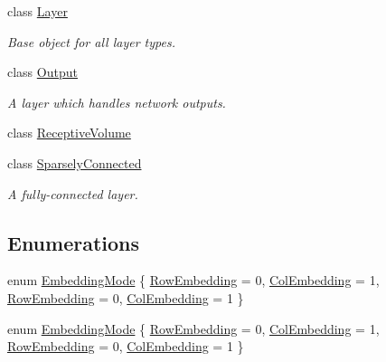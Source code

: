 \begin{DoxyCompactItemize}
class \hyperlink{classffnn_1_1layer_1_1_layer}{Layer}
\begin{DoxyCompactList}\small\item\em Base object for all layer types. \end{DoxyCompactList}\item 
class \hyperlink{classffnn_1_1layer_1_1_output}{Output}
\begin{DoxyCompactList}\small\item\em A layer which handles network outputs. \end{DoxyCompactList}\item 
class \hyperlink{classffnn_1_1layer_1_1_receptive_volume}{Receptive\-Volume}
\item 
class \hyperlink{classffnn_1_1layer_1_1_sparsely_connected}{Sparsely\-Connected}
\begin{DoxyCompactList}\small\item\em A fully-\/connected layer. \end{DoxyCompactList}\end{DoxyCompactItemize}
\subsection*{Enumerations}
\begin{DoxyCompactItemize}
\item 
enum \hyperlink{namespaceffnn_1_1layer_a254f16beba4fb335d935e9b43bb9e69a}{Embedding\-Mode} \{ \hyperlink{namespaceffnn_1_1layer_a254f16beba4fb335d935e9b43bb9e69aa56bf723aeae4562f2fe05ae5e675da92}{Row\-Embedding} = 0, 
\hyperlink{namespaceffnn_1_1layer_a254f16beba4fb335d935e9b43bb9e69aaede1065f5863208cae7e55561966a182}{Col\-Embedding} = 1, 
\hyperlink{namespaceffnn_1_1layer_a254f16beba4fb335d935e9b43bb9e69aa56bf723aeae4562f2fe05ae5e675da92}{Row\-Embedding} = 0, 
\hyperlink{namespaceffnn_1_1layer_a254f16beba4fb335d935e9b43bb9e69aaede1065f5863208cae7e55561966a182}{Col\-Embedding} = 1
 \}
\item 
enum \hyperlink{namespaceffnn_1_1layer_a254f16beba4fb335d935e9b43bb9e69a}{Embedding\-Mode} \{ \hyperlink{namespaceffnn_1_1layer_a254f16beba4fb335d935e9b43bb9e69aa56bf723aeae4562f2fe05ae5e675da92}{Row\-Embedding} = 0, 
\hyperlink{namespaceffnn_1_1layer_a254f16beba4fb335d935e9b43bb9e69aaede1065f5863208cae7e55561966a182}{Col\-Embedding} = 1, 
\hyperlink{namespaceffnn_1_1layer_a254f16beba4fb335d935e9b43bb9e69aa56bf723aeae4562f2fe05ae5e675da92}{Row\-Embedding} = 0, 
\hyperlink{namespaceffnn_1_1layer_a254f16beba4fb335d935e9b43bb9e69aaede1065f5863208cae7e55561966a182}{Col\-Embedding} = 1
 \}
\end{DoxyCompactItemize}
